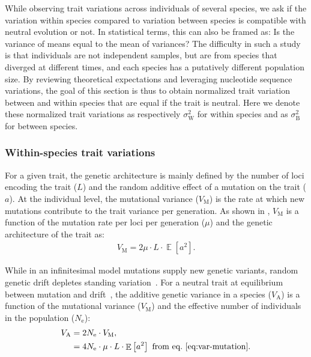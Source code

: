\documentclass{article}
\newcommand{\Multiply}{\cdot}
\DeclareMathOperator{\E}{\mathbb{E}}
\newcommand{\Ne}{N_{\text{e}}}
\newcommand{\MutationRatePheno}{\mu}
\newcommand{\NbrLoci}{L}
\newcommand{\VarGenetic}{V_{\mathrm{A}}}
\newcommand{\VarMutation}{V_{\mathrm{M}}}
\newcommand{\GenArchi}{\NbrLoci \Multiply \E \left[ a^2 \right]}
\newcommand{\RateBetween}{\sigma^2_{\mathrm{B}}}
\newcommand{\RateWhithin}{\sigma^2_{\mathrm{W}}}
\begin{document}
While observing trait variations across individuals of several species, we ask if the variation within species compared to variation between species is compatible with neutral evolution or not.
In statistical terms, this can also be framed as: Is the variance of means equal to the mean of variances?
The difficulty in such a study is that individuals are not independent samples, but are from species that diverged at different times, and each species has a putatively different population size.
By reviewing theoretical expectations and leveraging nucleotide sequence variations, the goal of this section is thus to obtain normalized trait variation between and within species that are equal if the trait is neutral.
Here we denote these normalized trait variations as respectively $\RateWhithin$ for within species and as $\RateBetween$ for between species.

\subsubsection{Within-species trait variations}

For a given trait, the genetic architecture is mainly defined by the number of loci encoding the trait ($\NbrLoci$) and the random additive effect of a mutation on the trait ($a$).
At the individual level, the mutational variance ($\VarMutation$) is the rate at which new mutations contribute to the trait variance per generation.
As shown in \textcite{lande_quantitative_1979, lande_sexual_1980}, $\VarMutation$ is a function of the mutation rate per loci per generation ($\MutationRatePheno$) and the genetic architecture of the trait as:
\begin{gather}
    \VarMutation = 2 \MutationRatePheno \Multiply \GenArchi \label{eq:var-mutation}.
\end{gather}

While in an infinitesimal model mutations supply new genetic variants, random genetic drift depletes standing variation~\parencite{turelli_commentary_2017, barton_infinitesimal_2017, sella_thinking_2019}.
For a neutral trait at equilibrium between mutation and drift~\parencite{lynch_mutation_1998}, the additive genetic variance in a species ($\VarGenetic$) is a function of the mutational variance ($\VarMutation$) and the effective number of individuals in the population ($\Ne$):
\begin{align}
    \VarGenetic & =  2 \Ne \Multiply \VarMutation, \\
    & = 4 \Ne \Multiply \MutationRatePheno \Multiply \GenArchi \text{ from eq.~\ref{eq:var-mutation}}\label{eq:var-genetic}.
\end{align}
\end{document}
